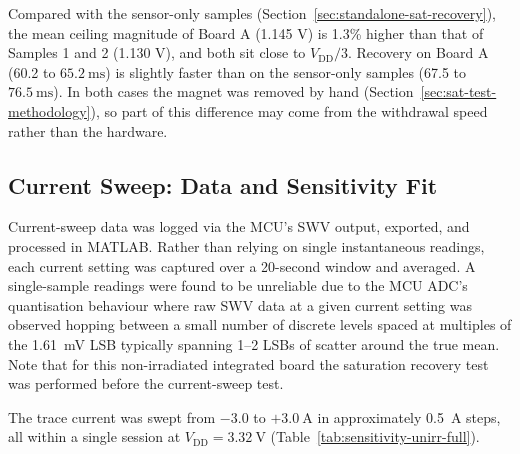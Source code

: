 \documentclass[12pt,a4paper]{article}
\begin{document}
Compared with the sensor-only samples (Section~\ref{sec:standalone-sat-recovery}), the mean ceiling magnitude of Board A (1.145 V) is 1.3\% higher than that of Samples 1 and 2 (1.130 V), and both sit close to $V_{\text{DD}}/3$. Recovery on Board A (60.2 to $\SI{65.2}{\milli\second}$) is slightly faster than on the sensor-only samples (67.5 to $\SI{76.5}{\milli\second}$). In both cases the magnet was removed by hand (Section~\ref{sec:sat-test-methodology}), so part of this difference may come from the withdrawal speed rather than the hardware.

\subsection{Current Sweep: Data and Sensitivity Fit}
\label{sec:sensitivity-fit}

Current-sweep data was logged via the MCU's SWV output, exported, and processed in MATLAB. Rather than relying on single instantaneous readings, each current setting was captured over a 20-second window and averaged. A single-sample readings were found to be unreliable due to the  MCU ADC's quantisation behaviour where raw SWV data at a given current setting was observed hopping between a small number of discrete levels spaced at multiples of the \SI{1.61}{\milli\volt} LSB typically spanning 1--2 LSBs of scatter around the true mean. Note that for this non-irradiated integrated board the saturation recovery test was performed before the current-sweep test.



The trace current was swept from $-3.0$ to $+\SI{3.0}{\ampere}$ in approximately \SI{0.5}{\ampere} steps, all within a single session at $V_{\text{DD}} = \SI{3.32}{\volt}$ (Table~\ref{tab:sensitivity-unirr-full}).
\end{document}

